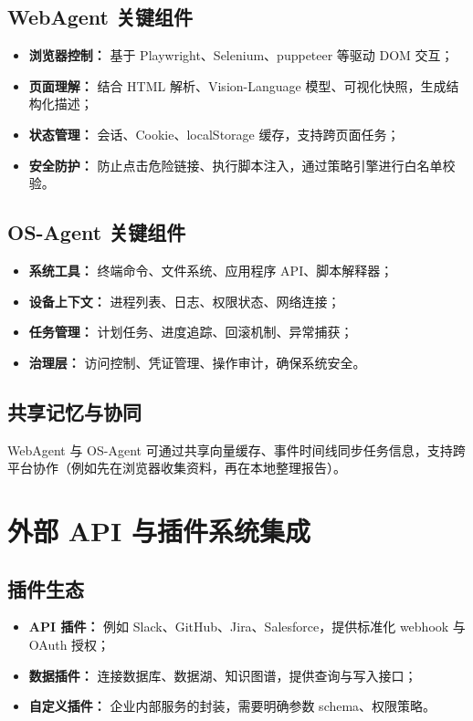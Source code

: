 \documentclass[UTF8,zihao=-4]{ctexart}
\begin{document}
\subsection{WebAgent 关键组件}
\begin{itemize}
  \item \textbf{浏览器控制：} 基于 Playwright、Selenium、puppeteer 等驱动 DOM 交互；
  \item \textbf{页面理解：} 结合 HTML 解析、Vision-Language 模型、可视化快照，生成结构化描述；
  \item \textbf{状态管理：} 会话、Cookie、localStorage 缓存，支持跨页面任务；
  \item \textbf{安全防护：} 防止点击危险链接、执行脚本注入，通过策略引擎进行白名单校验。
\end{itemize}

\subsection{OS-Agent 关键组件}
\begin{itemize}
  \item \textbf{系统工具：} 终端命令、文件系统、应用程序 API、脚本解释器；
  \item \textbf{设备上下文：} 进程列表、日志、权限状态、网络连接；
  \item \textbf{任务管理：} 计划任务、进度追踪、回滚机制、异常捕获；
  \item \textbf{治理层：} 访问控制、凭证管理、操作审计，确保系统安全。
\end{itemize}

\subsection{共享记忆与协同}
WebAgent 与 OS-Agent 可通过共享向量缓存、事件时间线同步任务信息，支持跨平台协作（例如先在浏览器收集资料，再在本地整理报告）。

\section{外部 API 与插件系统集成}
\subsection{插件生态}
\begin{itemize}
  \item \textbf{API 插件：} 例如 Slack、GitHub、Jira、Salesforce，提供标准化 webhook 与 OAuth 授权；
  \item \textbf{数据插件：} 连接数据库、数据湖、知识图谱，提供查询与写入接口；
  \item \textbf{自定义插件：} 企业内部服务的封装，需要明确参数 schema、权限策略。
\end{itemize}
\end{document}
